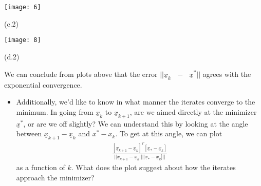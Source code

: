 \documentclass[11pt,letterpaper]{article}
\begin{document}
\begin{tcolorbox}
\begin{enumerate}[\quad\quad]
        \begin{minipage}{0.4\textwidth}
            \texttt{[image: 6]}
            \begin{center}
                (c.2)
            \end{center}
        \end{minipage}
        \begin{minipage}{0.1\textwidth}
            \begin{center}
                
            \end{center}
        \end{minipage}
        \begin{minipage}{0.4\textwidth}
                \texttt{[image: 8]}
                \begin{center}
                (d.2)
                \end{center}
        \end{minipage}
        We can conclude from plots above that the error ${||}\underline x_k \text{ $-$ } \underline x^{*} {||}$ agrees with the exponential convergence.
    \end{enumerate}
    \bigskip
    \begin{itemize}
        \item Additionally, we’d like to know in what manner the iterates converge to the minimum. In going from $\underline x_k$ to $\underline x_{k+1}$, are we aimed directly at the minimizer $\underline x^\ast$, or are we off slightly? We can understand this by looking at the angle between $\underline x_{k+1}-\underline x_k$ and $x^\ast - x_k$. To get at this angle, we can plot
        \begin{align}
            \frac{[\underline x_{k+1} - \underline x_k]^T [\underline x_\ast - \underline x_k]}
            {||\underline x_{k+1} - \underline x_k|| ||\underline x_\ast - \underline x_k]||}
        \end{align}
        as a function of $k$. What does the plot suggest about how the iterates approach the minimizer?
    \end{itemize}
\end{tcolorbox}
\newpage
\end{document}
